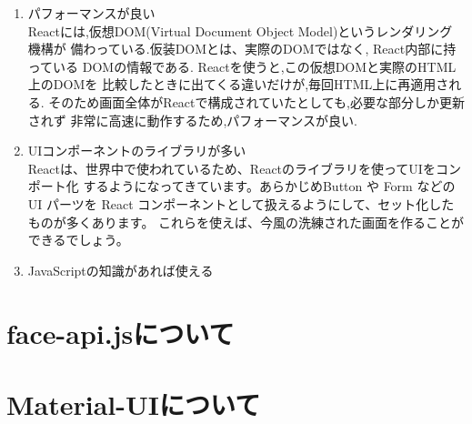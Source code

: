 	\begin{enumerate}
		\item パフォーマンスが良い \\
		Reactには,仮想DOM(Virtual Document Object Model)というレンダリング機構が
		備わっている.仮装DOMとは、実際のDOMではなく, React内部に持っている 
		DOMの情報である. Reactを使うと,この仮想DOMと実際のHTML上のDOMを
		比較したときに出てくる違いだけが,毎回HTML上に再適用される.
		そのため画面全体がReactで構成されていたとしても,必要な部分しか更新されず
		非常に高速に動作するため,パフォーマンスが良い.\\
		\item UIコンポーネントのライブラリが多い \\
		Reactは、世界中で使われているため、Reactのライブラリを使ってUIをコンポート化
		するようになってきています。あらかじめButton や Form などの UI パーツを
		React コンポーネントとして扱えるようにして、セット化したものが多くあります。
		これらを使えば、今風の洗練された画面を作ることができるでしょう。\\
		\item JavaScriptの知識があれば使える \\
	\end{enumerate}
	

\section{face-api.jsについて}
\label{sec:reference_bib}
	

\section{Material-UIについて}
\label{sec:reference_chapter}
	